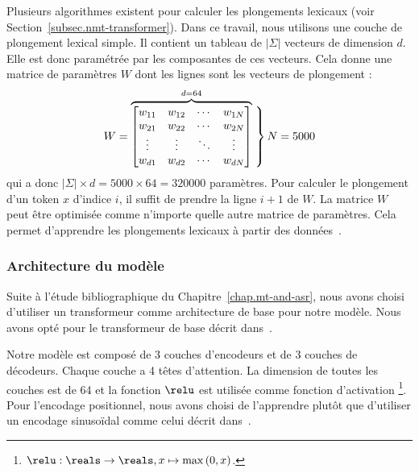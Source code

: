 Plusieurs algorithmes existent pour calculer les plongements lexicaux (voir Section~\ref{subsec.nmt-transformer}).
Dans ce travail, nous utilisons une couche de plongement lexical simple.
Il contient un tableau de \(|\Sigma|\) vecteurs de dimension \(d\).
Elle est donc paramétrée par les composantes de ces vecteurs.
Cela donne une matrice de paramètres \(W\) dont les lignes sont les vecteurs de plongement :
\begin{equation}
    W = \overbrace{
    \begin{bmatrix}
        w_{11} & w_{12} & \cdots & w_{1N}\\
        w_{21} & w_{22} & \cdots & w_{2N}\\
        \vdots & \vdots & \ddots & \vdots\\
        w_{d1} & w_{d2} & \cdots & w_{dN}\\
    \end{bmatrix}}^{d = 64}
    \left.\vphantom{
        \begin{bmatrix}
            w_{11} & w_{12} & \cdots & w_{1N}\\
            w_{21} & w_{22} & \cdots & w_{2N}\\
            \vdots & \vdots & \ddots & \vdots\\
            w_{d1} & w_{d2} & \cdots & w_{dN}\\
        \end{bmatrix}}\right\}N = 5000
\end{equation}
qui a donc \(|\Sigma| \times d = 5000 \times 64 = 320000\) paramètres.
Pour calculer le plongement d'un token \(x\) d'indice \(i\), il suffit de prendre la ligne \(i+1\) de \(W\).
La matrice \(W\) peut être optimisée comme n'importe quelle autre matrice de paramètres.
Cela permet d'apprendre les plongements lexicaux à partir des données~\cite{Paszke_et_al_2019}.


\subsubsection{Architecture du modèle}

Suite à l'étude bibliographique du Chapitre~\ref{chap.mt-and-asr}, 
nous avons choisi d'utiliser un transformeur comme architecture de base pour notre modèle.
Nous avons opté pour le transformeur de base décrit dans~\cite{attention}.

Notre modèle est composé de 3 couches d'encodeurs et de 3 couches de décodeurs.
Chaque couche a 4 têtes d'attention.
La dimension de toutes les couches est de 64
et la fonction \(\relu\) est utilisée comme fonction d'activation%
\footnote{\(\relu: \reals\to\reals, x\mapsto \max{(0, x)}\).}.
Pour l'encodage positionnel, nous avons choisi de l'apprendre plutôt que d'utiliser un encodage sinusoïdal
comme celui décrit dans~\cite{attention}.

